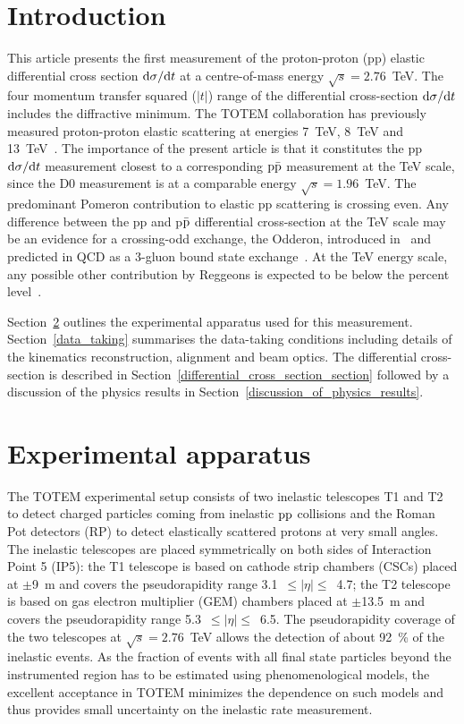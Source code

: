 \documentclass[TOTEM]{cernphprep}
\begin{document}
\section{Introduction}

This article presents the first measurement of the proton-proton (pp) elastic differential cross section ${\rm d}\sigma/{\rm d}t$ at a centre-of-mass energy $\sqrt{s}=2.76$~TeV. The four momentum transfer squared ($|t|$) range
of the differential cross-section ${\rm d}\sigma/{\rm d}t$ includes the diffractive minimum. The TOTEM collaboration has previously measured proton-proton elastic scattering at energies 7~TeV, 8~TeV and 13~TeV~\cite{Antchev:2013paa,Antchev:2016vpy,Antchev:2011vs,Antchev:2013iaa,Nemes:2017gut,Antchev:2017dia,Paper_2p76}.
The importance of the present article is that it constitutes the pp ${\rm d}\sigma/{\rm d}t$ measurement closest to a corresponding $\rm p\bar{p}$ measurement at the TeV scale, since the D0 measurement is at a comparable energy $\sqrt s = 1.96$~TeV. The predominant Pomeron contribution to elastic pp scattering
is crossing even. Any difference between the pp and p$\bar{\rm p}$ differential cross-section at the TeV scale may be an evidence for a crossing-odd exchange, the Odderon, introduced in~\cite{Lukaszuk:1973nt,Gauron:1992zc} and
predicted in QCD as a 3-gluon bound state exchange~\cite{Bartels:1999yt}. At
the TeV energy scale, any possible other contribution by Reggeons is expected to be below the percent level~\cite{Jenkovszky:2017efs}.

Section~\ref{experimental_apparatus} outlines the experimental apparatus used for this measurement. Section~\ref{data_taking} summarises the data-taking conditions
including details of the kinematics reconstruction, alignment and beam optics. The differential cross-section is described in Section~\ref{differential_cross_section_section} followed
by a discussion of the physics results in Section~\ref{discussion_of_physics_results}.

\section{Experimental apparatus}
\label{experimental_apparatus}


The TOTEM experimental setup consists of two inelastic telescopes T1 and T2 to detect charged particles coming from inelastic $\rm pp$ collisions and
the Roman Pot detectors (RP) to detect elastically scattered protons at very small angles.
The inelastic telescopes are placed symmetrically on both sides of Interaction Point 5 (IP5): the T1
telescope is based on cathode strip chambers (CSCs)
placed at $\pm$9~m and covers the pseudorapidity range 3.1~$\le |\eta| \le$~4.7; the T2 telescope is based on gas electron
multiplier (GEM) chambers placed at $\pm$13.5~m and covers the pseudorapidity range 5.3~$\le |\eta| \le$~6.5. The pseudorapidity coverage of the two telescopes at $\sqrt{s}=2.76$~TeV allows the detection of about 92~\% of the inelastic events. As the fraction of events with all final state particles beyond the instrumented region
has to be estimated using phenomenological models, the	
excellent acceptance in TOTEM minimizes the dependence on such models and thus provides small uncertainty on the
inelastic rate measurement.
\end{document}
